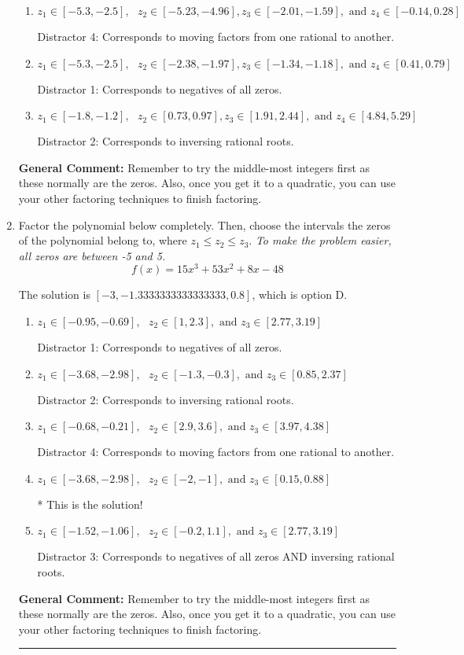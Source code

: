 \documentclass{extbook}[14pt]
\newcommand{\litem}[1]{\item #1

\rule{\textwidth}{0.4pt}}
\begin{document}
\begin{enumerate}
{\begin{enumerate}[label=\Alph*.]
* This is the solution!
\item \( z_1 \in [-5.3, -2.5], \text{   }  z_2 \in [-5.23, -4.96], z_3 \in [-2.01, -1.59], \text{   and   } z_4 \in [-0.14, 0.28] \)

 Distractor 4: Corresponds to moving factors from one rational to another.
\item \( z_1 \in [-5.3, -2.5], \text{   }  z_2 \in [-2.38, -1.97], z_3 \in [-1.34, -1.18], \text{   and   } z_4 \in [0.41, 0.79] \)

 Distractor 1: Corresponds to negatives of all zeros.
\item \( z_1 \in [-1.8, -1.2], \text{   }  z_2 \in [0.73, 0.97], z_3 \in [1.91, 2.44], \text{   and   } z_4 \in [4.84, 5.29] \)

 Distractor 2: Corresponds to inversing rational roots.
\end{enumerate}

\textbf{General Comment:} Remember to try the middle-most integers first as these normally are the zeros. Also, once you get it to a quadratic, you can use your other factoring techniques to finish factoring.
}
\litem{
Factor the polynomial below completely. Then, choose the intervals the zeros of the polynomial belong to, where $z_1 \leq z_2 \leq z_3$. \textit{To make the problem easier, all zeros are between -5 and 5.}
\[ f(x) = 15x^{3} +53 x^{2} +8 x -48 \]

The solution is \( [-3, -1.3333333333333333, 0.8] \), which is option D.\begin{enumerate}[label=\Alph*.]
\item \( z_1 \in [-0.95, -0.69], \text{   }  z_2 \in [1, 2.3], \text{   and   } z_3 \in [2.77, 3.19] \)

 Distractor 1: Corresponds to negatives of all zeros.
\item \( z_1 \in [-3.68, -2.98], \text{   }  z_2 \in [-1.3, -0.3], \text{   and   } z_3 \in [0.85, 2.37] \)

 Distractor 2: Corresponds to inversing rational roots.
\item \( z_1 \in [-0.68, -0.21], \text{   }  z_2 \in [2.9, 3.6], \text{   and   } z_3 \in [3.97, 4.38] \)

 Distractor 4: Corresponds to moving factors from one rational to another.
\item \( z_1 \in [-3.68, -2.98], \text{   }  z_2 \in [-2, -1], \text{   and   } z_3 \in [0.15, 0.88] \)

* This is the solution!
\item \( z_1 \in [-1.52, -1.06], \text{   }  z_2 \in [-0.2, 1.1], \text{   and   } z_3 \in [2.77, 3.19] \)

 Distractor 3: Corresponds to negatives of all zeros AND inversing rational roots.
\end{enumerate}

\textbf{General Comment:} Remember to try the middle-most integers first as these normally are the zeros. Also, once you get it to a quadratic, you can use your other factoring techniques to finish factoring.
}
\end{enumerate}
\end{document}
